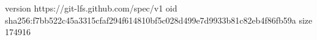 version https://git-lfs.github.com/spec/v1
oid sha256:f7bb522c45a3315cfaf294f614810bf5c028d499e7d9933b81c82eb4f86fb59a
size 174916

